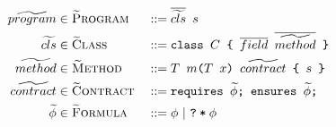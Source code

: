 \begin{align*}
	\grad{program}  & \in \setGProgram  &  & ::= \ttt{$\overline{\grad{cls}}$~$s$}                              \\
	\grad{cls}      & \in \setGClass    &  & ::= \class {$C$} {$\overline{field}$} {$\overline{\grad{method}}$} \\
	\grad{method}   & \in \setGMethod   &  & ::= \method {$T$} {$m$} {$T$} {$x$} {$\grad{contract}$} {$s$}      \\
	\grad{contract} & \in \setGContract &  & ::= \contract{$\grad{\phi}$}{$\grad{\phi}$}                        \\
	\grad{\phi}     & \in \setGFormula  &  & ::= \phi ~|~ \withqm{\phi}
\end{align*}